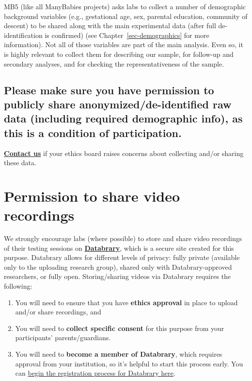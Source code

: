 \documentclass[
  letterpaper,
  DIV=11,
  numbers=noendperiod,
  oneside]{scrreprt}
\providecommand{\tightlist}{%
  \setlength{\itemsep}{0pt}\setlength{\parskip}{0pt}}
\begin{document}
MB5 (like all ManyBabies projects) asks labs to collect a number of
demographic background variables (e.g., gestational age, sex, parental
education, community of descent) to be shared along with the main
experimental data (after full de-identification is confirmed) (see
Chapter~\ref{sec-demographics} for more information). Not all of those
variables are part of the main analysis. Even so, it is highly relevant
to collect them for describing our sample, for follow-up and secondary
analyses, and for checking the representativeness of the sample.

\subsection*{Please make sure you have permission to publicly share
anonymized/de-identified raw data (including required demographic info),
as this is a condition of
participation.}\label{please-make-sure-you-have-permission-to-publicly-share-anonymizedde-identified-raw-data-including-required-demographic-info-as-this-is-a-condition-of-participation.}

\href{mailto:mb5@manybabies.org}{\textbf{Contact us}} if your ethics
board raises concerns about collecting and/or sharing these data.

\section{Permission to share video
recordings}\label{permission-to-share-video-recordings}

We strongly encourage labs (where possible) to store and share video
recordings of their testing sessions on
\href{https://nyu.databrary.org/}{\textbf{Databrary}}, which is a secure
site created for this purpose. Databrary allows for different levels of
privacy: fully private (available only to the uploading research group),
shared only with Databrary-approved researchers, or fully open.
Storing/sharing videos via Databrary requires the following:

\begin{enumerate}
\def\labelenumi{(\arabic{enumi})}
\setcounter{enumi}{15}
\tightlist
\item
  You will need to ensure that you have \textbf{ethics approval} in
  place to upload and/or share recordings, and
\item
  You will need to \textbf{collect specific consent} for this purpose
  from your participants' parents/guardians.
\item
  You will need to \textbf{become a member of Databrary}, which requires
  approval from your institution, so it's helpful to start this process
  early. You can
  \href{https://nyu.databrary.org/user/register?page=create}{begin the
  registration process for Databrary here}.
\end{enumerate}
\end{document}
